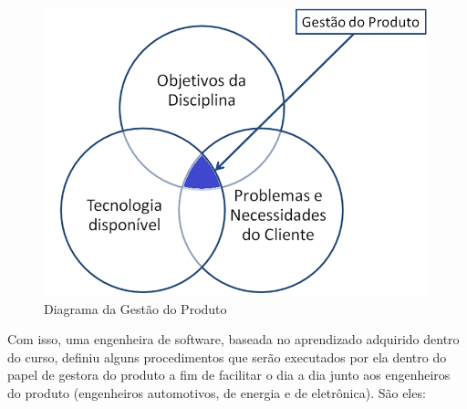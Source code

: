 \begin{figure}[H]
		\centering
			\includegraphics[scale=0.6]{figuras/gestaoproduto.png}
		\caption{Diagrama da Gestão do Produto}
		\label{gestaoproduto}
\end{figure}

Com isso, uma engenheira de software, baseada no aprendizado adquirido dentro do curso, definiu alguns procedimentos que serão executados por ela dentro do papel de gestora do produto a fim de facilitar o dia a dia junto aos engenheiros do produto (engenheiros automotivos, de energia e de eletrônica). São eles:

